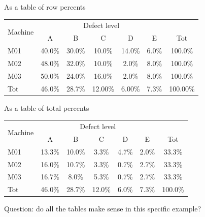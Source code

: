 \begin{frame}
  \vspace{0.5cm}
  As a table of row percents
  \vspace{1cm}
  \begin{center}
    \begin{tabular}{|l|c|c|c|c|c|c|}
      \hline      
      \multirow{2}{*}{\parbox{1.5cm}{Machine}}& \multicolumn{5}{c|}{Defect level}& \\
      \cline{2-6}
       & A&B&C&D&E &Tot\\
      \hline
      M01&40.0\%&30.0\%&10.0\%&14.0\%&6.0\%&100.0\%\\
      \hline
      M02&48.0\%&32.0\%&10.0\%&2.0\%&8.0\%&100.0\%\\
      \hline
      M03&50.0\%&24.0\%&16.0\%&2.0\%&8.0\%&100.0\%\\
      \hline
      Tot& 46.0\%&28.7\%&12.00\%&6.00\%&7.3\%&100.00\%\\
      \hline
    \end{tabular}
  \end{center}
\end{frame}

\begin{frame}
  \vspace{0.5cm}
  As a table of total percents
  \vspace{1cm}
  \begin{center}
    \begin{tabular}{|l|c|c|c|c|c|c|}
      \hline      
      \multirow{2}{*}{\parbox{1.5cm}{Machine}}& \multicolumn{5}{c|}{Defect level}& \\
      \cline{2-6}
      & A&B&C&D&E &Tot\\
      \hline
      M01&13.3\%& 10.0\%&3.3\%&4.7\%&2.0\%&33.3\%\\
      \hline
      M02&16.0\%&10.7\%&3.3\%&0.7\%&2.7\%&33.3\%\\
      \hline
      M03&16.7\%&8.0\%&5.3\%&0.7\%&2.7\%&33.3\%\\
      \hline
      Tot& 46.0\%&28.7\%&12.0\%&6.0\%&7.3\%&100.0\%\\
      \hline
   \end{tabular}
  \end{center}
  \vspace{1cm}
  Question: do all the tables make sense in this specific example?
\end{frame}



